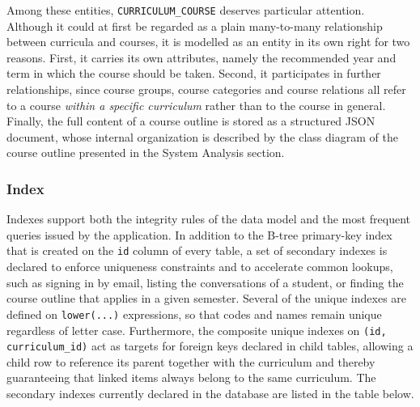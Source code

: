 Among these entities, \texttt{CURRICULUM\_COURSE} deserves particular attention. Although it could at first be regarded as a plain many-to-many relationship between curricula and courses, it is modelled as an entity in its own right for two reasons. First, it carries its own attributes, namely the recommended year and term in which the course should be taken. Second, it participates in further relationships, since course groups, course categories and course relations all refer to a course \emph{within a specific curriculum} rather than to the course in general. Finally, the full content of a course outline is stored as a structured JSON document, whose internal organization is described by the class diagram of the course outline presented in the System Analysis section.

\subsubsection{Index}
\label{subsubsec:db-index}

Indexes support both the integrity rules of the data model and the most frequent queries issued by the application. In addition to the B-tree primary-key index that is created on the \texttt{id} column of every table, a set of secondary indexes is declared to enforce uniqueness constraints and to accelerate common lookups, such as signing in by email, listing the conversations of a student, or finding the course outline that applies in a given semester. Several of the unique indexes are defined on \texttt{lower(...)} expressions, so that codes and names remain unique regardless of letter case. Furthermore, the composite unique indexes on \texttt{(id, curriculum\_id)} act as targets for foreign keys declared in child tables, allowing a child row to reference its parent together with the curriculum and thereby guaranteeing that linked items always belong to the same curriculum. The secondary indexes currently declared in the database are listed in the table below.

